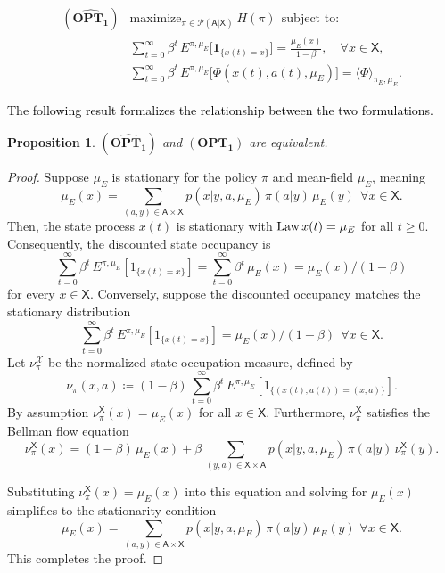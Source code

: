 \documentclass[11pt]{article}
\newcommand{\Law}{\mathop{\rm Law}}
\newcommand{\sX}{{\mathsf X}}
\newcommand{\sA}{{\mathsf A}}
\newcommand{\Pnew}{{\mathcal P}}
\newcommand{\tb}[1]{\textcolor{black}{#1}} %
\newtheorem{proposition}{Proposition}[section]
\begin{document}
\renewcommand\arraystretch{1.5}
\[
\begin{array}{ll}
\mathbf{(\widehat{OPT_1})} 
& \text{maximize}_{\pi \in \Pnew(\sA|\sX)} \ H(\pi)  ~~  \text{subject to:} \\[2pt]
& \displaystyle \sum_{t=0}^{\infty} \beta^t \, E^{\pi,\mu_E} \big[ \mathbf{1}_{\{x(t)=x\}} \big] 
    = \frac{\mu_E(x)}{1-\beta}, \quad \forall x \in \sX, \\[6pt]
& \displaystyle \sum_{t=0}^{\infty} \beta^t \, E^{\pi,\mu_E} \big[ \Phi(x(t),a(t),\mu_E) \big] 
    = \langle \Phi \rangle_{\pi_E,\mu_E}.
\end{array}
\]


\tb{The following result formalizes the relationship between the two formulations.}



 
\begin{proposition} \label{pr3}
	$\mathbf{(\widehat{OPT_1})}$ and $\mathbf{(OPT_1)}$ are equivalent. 
\end{proposition}

\begin{proof}
	Suppose $\mu_E$ is stationary for the policy $\pi$ and mean-field $\mu_E$, meaning
	$$
	\mu_E(x) = \sum_{(a,y) \in \sA \times \sX} p(x|y,a,\mu_E) \, \pi(a|y) \, \mu_E(y) ~~ \forall x \in \sX.
	$$
	Then, the state process ${x(t)}$ is stationary with $\Law{x(t)} = \mu_E$ for all $t \geq 0$. Consequently, the discounted state occupancy is
	$$
	\sum_{t=0}^{\infty} \beta^t \, E^{\pi,\mu_E} [1_{\{x(t)=x\}}] = \sum_{t=0}^{\infty} \beta^t \, \mu_E(x) = \mu_E(x)/(1-\beta)
    $$
	for every $x \in \sX$. Conversely, suppose the discounted occupancy matches the stationary distribution
	$$
	\sum_{t=0}^{\infty} \beta^t \, E^{\pi,\mu_E} [1_{\{x(t)=x\}}] =   \mu_E(x)/(1-\beta)  ~~ \forall x \in \sX.
	$$
    Let $\nu_{\pi}^{\mathcal{X}}$ be the normalized state occupation measure, defined by
    $$
	\nu_{\pi}(x,a) \coloneqq (1-\beta) \, \sum_{t=0}^{\infty} \beta^t \, E^{\pi,\mu_E} \left[ 1_{\{(x(t),a(t)) = (x,a)\}} \right].
	$$
    By assumption $\nu_{\pi}^{\sX}(x)=\mu_E(x)$ for all $x \in \sX$. Furthermore, $\nu_{\pi}^{\sX}$ satisfies the Bellman flow equation
$$
	\nu_{\pi}^{\sX}(x) = (1-\beta) \, \mu_E(x)  + \beta \, \sum_{(y,a) \in \sX\times\sA} p(x|y,a,\mu_E) \, \pi(a|y) \, \nu_{\pi}^{\sX}(y).$$
	
    Substituting $\nu_{\pi}^{\sX}(x)=\mu_E(x)$ into this equation and solving for $\mu_E(x)$ simplifies to the stationarity condition
    $$
	\mu_E(x) = \sum_{(a,y) \in \sA \times \sX} p(x|y,a,\mu_E) \, \pi(a|y) \, \mu_E(y) \,\, \forall x \in \sX. 
	$$
    This completes the proof.
\end{proof}
\end{document}
